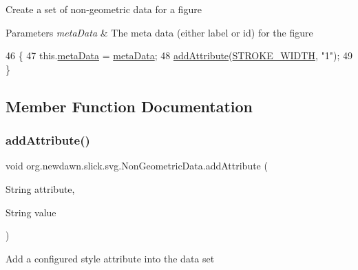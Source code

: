 Create a set of non-\/geometric data for a figure


\begin{DoxyParams}{Parameters}
{\em meta\+Data} & The meta data (either label or id) for the figure \\
\hline
\end{DoxyParams}

\begin{DoxyCode}
46                                              \{
47         this.\mbox{\hyperlink{classorg_1_1newdawn_1_1slick_1_1svg_1_1_non_geometric_data_ab9720408fbd609767acb6528999a3f8d}{metaData}} = \mbox{\hyperlink{classorg_1_1newdawn_1_1slick_1_1svg_1_1_non_geometric_data_ab9720408fbd609767acb6528999a3f8d}{metaData}};
48         \mbox{\hyperlink{classorg_1_1newdawn_1_1slick_1_1svg_1_1_non_geometric_data_adfa186ba29a3db6f3210a861e5e55a45}{addAttribute}}(\mbox{\hyperlink{classorg_1_1newdawn_1_1slick_1_1svg_1_1_non_geometric_data_abe7b202a653bece82879b8108bc608bd}{STROKE\_WIDTH}}, \textcolor{stringliteral}{"1"});
49     \}
\end{DoxyCode}


\subsection{Member Function Documentation}
\mbox{\label{classorg_1_1newdawn_1_1slick_1_1svg_1_1_non_geometric_data_adfa186ba29a3db6f3210a861e5e55a45}} 
\subsubsection{\texorpdfstring{add\+Attribute()}{addAttribute()}}
{\footnotesize\ttfamily void org.\+newdawn.\+slick.\+svg.\+Non\+Geometric\+Data.\+add\+Attribute (\begin{DoxyParamCaption}\item[{String}]{attribute,  }\item[{String}]{value }\end{DoxyParamCaption})\hspace{0.3cm}{\ttfamily [inline]}}

Add a configured style attribute into the data set


